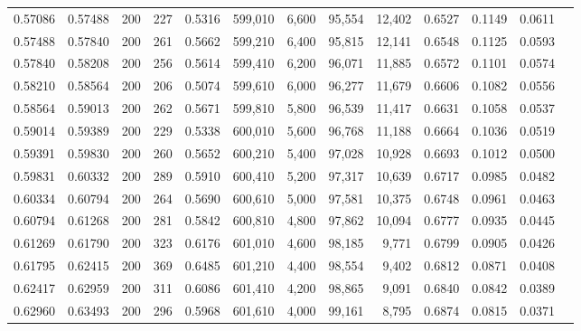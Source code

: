 \begin{tabular}{rrrrrrrrrrrrr}
0.57086 & 0.57488 &    200 & 227 &                                     0.5316 & 599,010 &   6,600 &  95,554 &  12,402 & 0.6527 & 0.1149 & 0.0611 \\
0.57488 & 0.57840 &    200 & 261 &                                     0.5662 & 599,210 &   6,400 &  95,815 &  12,141 & 0.6548 & 0.1125 & 0.0593 \\
0.57840 & 0.58208 &    200 & 256 &                                     0.5614 & 599,410 &   6,200 &  96,071 &  11,885 & 0.6572 & 0.1101 & 0.0574 \\
0.58210 & 0.58564 &    200 & 206 &                                     0.5074 & 599,610 &   6,000 &  96,277 &  11,679 & 0.6606 & 0.1082 & 0.0556 \\
0.58564 & 0.59013 &    200 & 262 &                                     0.5671 & 599,810 &   5,800 &  96,539 &  11,417 & 0.6631 & 0.1058 & 0.0537 \\
0.59014 & 0.59389 &    200 & 229 &                                     0.5338 & 600,010 &   5,600 &  96,768 &  11,188 & 0.6664 & 0.1036 & 0.0519 \\
0.59391 & 0.59830 &    200 & 260 &                                     0.5652 & 600,210 &   5,400 &  97,028 &  10,928 & 0.6693 & 0.1012 & 0.0500 \\
0.59831 & 0.60332 &    200 & 289 &                                     0.5910 & 600,410 &   5,200 &  97,317 &  10,639 & 0.6717 & 0.0985 & 0.0482 \\
0.60334 & 0.60794 &    200 & 264 &                                     0.5690 & 600,610 &   5,000 &  97,581 &  10,375 & 0.6748 & 0.0961 & 0.0463 \\
0.60794 & 0.61268 &    200 & 281 &                                     0.5842 & 600,810 &   4,800 &  97,862 &  10,094 & 0.6777 & 0.0935 & 0.0445 \\
0.61269 & 0.61790 &    200 & 323 &                                     0.6176 & 601,010 &   4,600 &  98,185 &   9,771 & 0.6799 & 0.0905 & 0.0426 \\
0.61795 & 0.62415 &    200 & 369 &                                     0.6485 & 601,210 &   4,400 &  98,554 &   9,402 & 0.6812 & 0.0871 & 0.0408 \\
0.62417 & 0.62959 &    200 & 311 &                                     0.6086 & 601,410 &   4,200 &  98,865 &   9,091 & 0.6840 & 0.0842 & 0.0389 \\
0.62960 & 0.63493 &    200 & 296 &                                     0.5968 & 601,610 &   4,000 &  99,161 &   8,795 & 0.6874 & 0.0815 & 0.0371 \\

\end{tabular}
